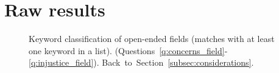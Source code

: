 \clearpage
\section{Raw results%
}\label{app:raw_results}


\begin{figure}[h!]
    \caption[Keyword classification of open-ended fields]{Keyword classification of open-ended fields (matches with at least one keyword in a list). (Questions~\ref{q:concerns_field}-\ref{q:injustice_field}). \hfill Back~to~Section~\ref{subsec:considerations}.
    }\label{fig:field_keyword}
\end{figure}

